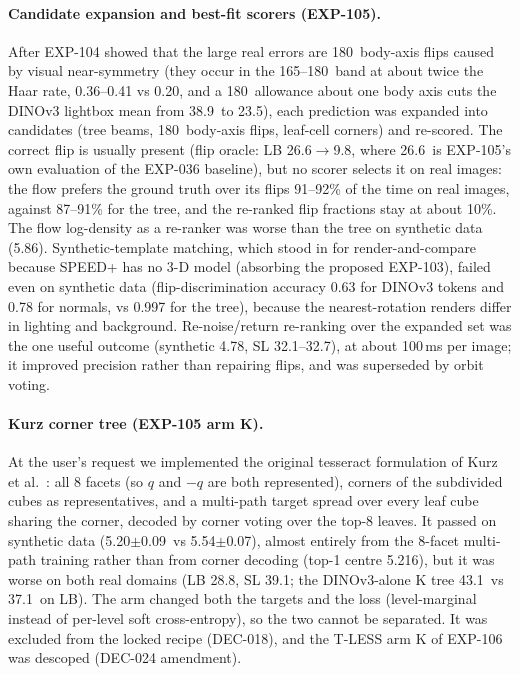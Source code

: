 \paragraph{Candidate expansion and best-fit scorers (EXP-105).}
After EXP-104 showed that the large real errors are 180\appDdeg\ body-axis flips caused by visual near-symmetry (they occur in the 165--180\appDdeg\ band at about twice the Haar rate, 0.36--0.41 vs 0.20, and a 180\appDdeg\ allowance about one body axis cuts the DINOv3 lightbox mean from 38.9\appDdeg\ to 23.5\appDdeg), each prediction was expanded into candidates (tree beams, 180\appDdeg\ body-axis flips, leaf-cell corners) and re-scored. The correct flip is usually present (flip oracle: LB 26.6$\to$9.8\appDdeg, where 26.6\appDdeg\ is EXP-105's own evaluation of the EXP-036 baseline), but no scorer selects it on real images: the flow prefers the ground truth over its flips 91--92\% of the time on real images, against 87--91\% for the tree, and the re-ranked flip fractions stay at about 10\%. The flow log-density as a re-ranker was worse than the tree on synthetic data (5.86\appDdeg). Synthetic-template matching, which stood in for render-and-compare because SPEED+ has no 3-D model (absorbing the proposed EXP-103), failed even on synthetic data (flip-discrimination accuracy 0.63 for DINOv3 tokens and 0.78 for normals, vs 0.997 for the tree), because the nearest-rotation renders differ in lighting and background. Re-noise/return re-ranking over the expanded set was the one useful outcome (synthetic 4.78\appDdeg, SL 32.1--32.7\appDdeg), at about 100\,ms per image; it improved precision rather than repairing flips, and was superseded by orbit voting.

\paragraph{Kurz corner tree (EXP-105 arm K).}
At the user's request we implemented the original tesseract formulation of Kurz et al.~\cite{kurz2017tesseract}: all 8 facets (so $q$ and $-q$ are both represented), corners of the subdivided cubes as representatives, and a multi-path target spread over every leaf cube sharing the corner, decoded by corner voting over the top-8 leaves. It passed on synthetic data (5.20$\pm$0.09\appDdeg\ vs 5.54$\pm$0.07\appDdeg), almost entirely from the 8-facet multi-path training rather than from corner decoding (top-1 centre 5.216\appDdeg), but it was worse on both real domains (LB 28.8\appDdeg, SL 39.1\appDdeg; the DINOv3-alone K tree 43.1\appDdeg\ vs 37.1\appDdeg\ on LB). The arm changed both the targets and the loss (level-marginal instead of per-level soft cross-entropy), so the two cannot be separated. It was excluded from the locked recipe (DEC-018), and the T-LESS arm K of EXP-106 was descoped (DEC-024 amendment).

